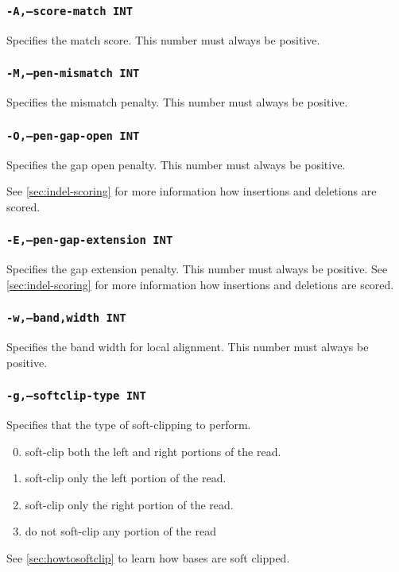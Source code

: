 \documentclass[a4paper,12pt]{book}
\newcommand{\TT}[1]{{\tt #1}} %
\begin{document}
\subsubsection{\TT{-A,--score-match INT}}
Specifies the match score.
This number must always be positive.

\subsubsection{\TT{-M,--pen-mismatch INT}}
Specifies the mismatch penalty.
This number must always be positive.

\subsubsection{\TT{-O,--pen-gap-open INT}}
Specifies the gap open penalty.
This number must always be positive.

See \autoref{sec:indel-scoring} for more information how insertions and deletions are scored.
\subsubsection{\TT{-E,--pen-gap-extension INT}}
Specifies the gap extension penalty.
This number must always be positive.
See \autoref{sec:indel-scoring} for more information how insertions and deletions are scored.

\subsubsection{\TT{-w,--band,width INT}}
Specifies the band width for local alignment.
This number must always be positive.

\subsubsection{\TT{-g,--softclip-type INT}}
Specifies that the type of soft-clipping to perform.
\begin{enumerate}
	\setcounter{enumi}{-1} %
	\item soft-clip both the left and right portions of the read.
	\item soft-clip only the left portion of the read.
	\item soft-clip only the right portion of the read.
	\item do not soft-clip any portion of the read
\end{enumerate}
See \autoref{sec:howtosoftclip} to learn how bases are soft clipped.
\end{document}

